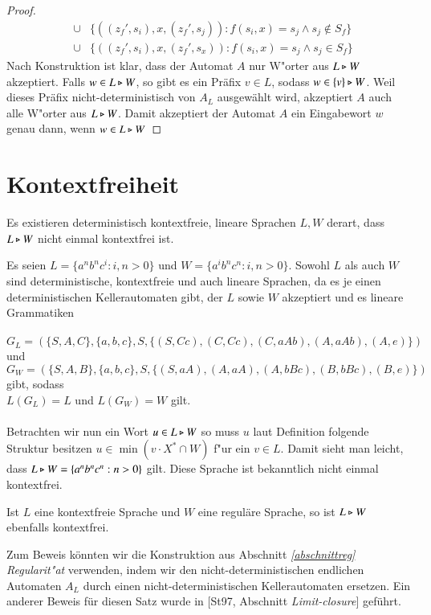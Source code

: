 \begin{proof}
\begin{eqnarray}
 & \cup & \{ ((z_f',s_i),x,(z_f',s_j)) : f(s_i,x)=s_j  \wedge s_j \notin S_f\} \label{auto3}\\
 & \cup & \{ ((z_f',s_i),x,(z_f',s_x)) : f(s_i,x)=s_j  \wedge s_j \in S_f \label{auto4} \}
\end{eqnarray}
Nach Konstruktion ist klar, dass der Automat $A$ nur W"orter aus $L\triangleright W$ akzeptiert. Falls $w\in L\triangleright W$, so gibt es ein Präfix $v\in L$, sodass $w\in \{v\}\triangleright W$. Weil dieses Präfix nicht-deterministisch von $A_L$ ausgewählt wird, akzeptiert $A$ auch alle W"orter aus $L\triangleright W$.
Damit akzeptiert der Automat $A$ ein Eingabewort $w$ genau dann, wenn $w\in L\triangleright W$
\end{proof}

\section{Kontextfreiheit}
Es existieren deterministisch kontextfreie, lineare Sprachen $L,W$ derart, dass $L\triangleright W$ nicht einmal kontextfrei ist.

\vspace{2ex}

\begin{beispiel}
Es seien $L=\{a^nb^nc^i:i,n>0\}$ und $W=\{a^ib^nc^n:i,n>0\}$. Sowohl $L$ als auch $W$ sind deterministische, kontextfreie und auch lineare Sprachen, da es je einen deterministischen Kellerautomaten gibt, der $L$ sowie $W$ akzeptiert und es lineare Grammatiken \\\\$G_L = (\{S,A,C\},\{a,b,c\},S,\{ (S,Cc),(C,Cc),(C,aAb),(A,aAb),(A,e)\})$ und \\$G_W = (\{S,A,B\},\{a,b,c\},S,\{ (S,aA),(A,aA),(A,bBc),(B,bBc),(B,e) \})$ gibt, sodass \\$L(G_L) = L$ und $L(G_W) = W$ gilt.\\\\
Betrachten wir nun ein Wort $u\in L\triangleright W$ so muss $u$ laut Definition folgende Struktur besitzen $u\in \min( v\cdot X^* \cap W)$ f"ur ein $v \in L$.
Damit sieht man leicht, dass $L\triangleright W= \{a^nb^nc^n:n>0\}$ gilt. Diese Sprache ist bekanntlich nicht einmal kontextfrei.
\end{beispiel}

\vspace{2ex}

\begin{satz}
Ist $L$ eine kontextfreie Sprache und $W$ eine reguläre Sprache, so ist $L\triangleright W$ ebenfalls kontextfrei.
\end{satz}
Zum Beweis könnten wir die Konstruktion aus Abschnitt \emph{\ref{abschnittreg} Regularit"at} verwenden, indem wir den nicht-deterministischen endlichen Automaten $A_L$ durch einen nicht-deterministischen Kellerautomaten ersetzen.
Ein anderer Beweis für diesen Satz wurde in [St97, Abschnitt \emph{Limit-closure}] geführt.
\newpage

